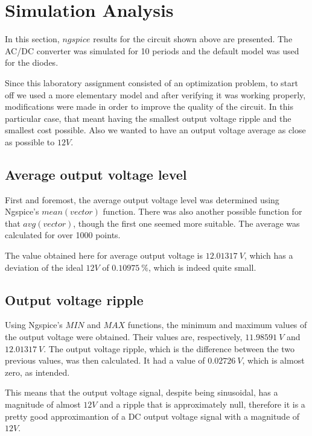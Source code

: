 \section{Simulation Analysis}
\label{sec:simulation}

In this section, $ngspice$ results for the circuit shown above are presented. The AC/DC converter was simulated for 10 periods and the default model was used for the diodes.

Since this laboratory assignment consisted of an optimization problem, to start off we used a more elementary model and after verifying it was working properly, modifications were made in order to improve the quality of the circuit. In this particular case, that meant having the smallest output voltage ripple and the smallest cost possible. Also we wanted to have an output voltage average as close as possible to  $12 V$.




\subsection{Average output voltage level}
First and foremost, the average output voltage level was determined using Ngspice's $mean(vector)$ function. There was also another possible function for that $avg(vector)$, though the first one seemed more suitable. The average was calculated for over 1000 points.

The value obtained here for average output voltage is $12.01317 \ V$,
which has a deviation of the ideal $12 V$ of $0.10975 \ \%$, which is indeed quite small.




\subsection{Output voltage ripple}
Using Ngspice's $MIN$ and $MAX$ functions, the minimum and maximum values of the output voltage were obtained. Their values are, respectively, $11.98591 \ V$ and $12.01317 \ V$. The output voltage ripple, which is the difference between the two previous values, was then calculated. It had a value of $0.02726 \ V$, which is almost zero, as intended.


This means that the output voltage signal, despite being sinusoidal, has a magnitude of almost $12 V$ and a ripple that is approximately null, therefore it is a pretty good approximantion of a DC output voltage signal with a magnitude of $12 V$.




